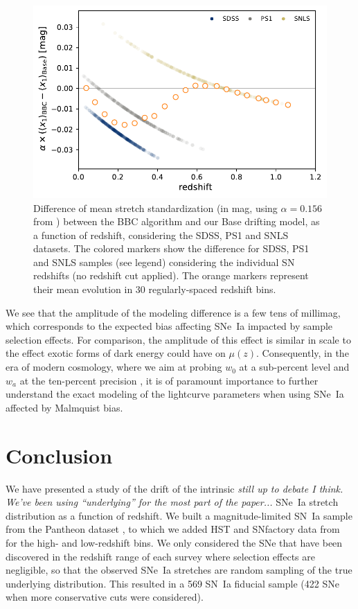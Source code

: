 \documentclass[]{aa} %
\newcommand{\nn}[1]{{\textcolor[rgb]{0.25, 0.50, 0}{#1}}}
\newcommand{\yc}[1]{{\textcolor{BrickRed}{#1}}}
\begin{document}
\begin{figure}
    \centering
    \includegraphics[width=\linewidth]{Article_figures/BBC_-stretchevol_grouped.pdf}
    \caption{Difference of mean stretch standardization (in mag, using
        $\alpha=0.156$ from \citealt{scolnic2018a}) between the BBC algorithm
        and our Base drifting model, as a function of redshift, considering the
        SDSS, PS1 and SNLS datasets. The colored markers show the difference for
        SDSS, PS1 and SNLS samples (see legend) considering the individual SN
    redshifts (no redshift cut applied). The orange markers represent their mean
evolution in 30 regularly-spaced redshift bins.}
    \label{fig:magdrift}
\end{figure}

We see that the amplitude of the modeling difference is a few tens of millimag,
which corresponds to the expected bias affecting SNe~Ia impacted by sample
selection effects. For comparison, the amplitude of this effect is similar in
scale to the effect exotic forms of dark energy could have on $\mu(z)$.
Consequently, in the era of modern cosmology, where we aim at probing $w_0$ at a
sub-percent level and $w_a$ at the ten-percent precision
\citep[e.g.,][]{lsstpaper}, it is of paramount importance to further understand
the exact modeling of the lightcurve parameters when using SNe~Ia affected by
Malmquist bias.

\section{Conclusion}\label{sec:ccl}

We have presented a study of the drift of the \yc{intrinsic} \nn{\textit{still
up to debate I think. We've been using ``underlying'' for the most part of
the paper...}} SNe~Ia stretch distribution as a function of redshift. We
built a magnitude-limited SN~Ia sample from the Pantheon dataset
\citep[][SDSS, PS1 and SNLS]{scolnic2018a}, to which we added HST and SNfactory
data from \cite{rigault2018} for the high- and low-redshift bins. We only
considered the SNe that have been discovered in the redshift range of each
survey where selection effects are negligible, so that the observed SNe~Ia
stretches are random sampling of the true underlying distribution. This
resulted in a 569 SN~Ia fiducial sample (422 SNe when more
conservative cuts were considered).
\end{document}

